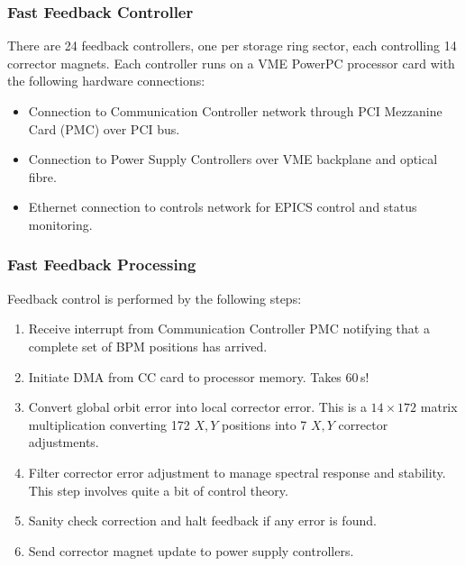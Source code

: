 \documentclass{beamer}
\begin{document}
%
\begin{frame}\frametitle{Fast Feedback Controller}

There are 24 feedback controllers, one per storage ring sector, each controlling
14 corrector magnets.  Each controller runs on a VME PowerPC processor card with
the following hardware connections:

\begin{itemize}
\item Connection to Communication Controller network through PCI Mezzanine Card
(PMC) over PCI bus.
\item Connection to Power Supply Controllers over VME backplane and optical
fibre.
\item Ethernet connection to controls network for EPICS control and status
monitoring.
\end{itemize}


\end{frame}


%
\begin{frame}\frametitle{Fast Feedback Processing}

Feedback control is performed by the following steps:

\begin{enumerate}
\item Receive interrupt from Communication Controller PMC notifying that a
complete set of BPM positions has arrived.
\item Initiate DMA from CC card to processor memory.  Takes 60\,\textmu s!
\item Convert global orbit error into local corrector error.  This is a $14
\times 172$ matrix multiplication converting 172 $X,Y$ positions into 7 $X,Y$
corrector adjustments.
\item Filter corrector error adjustment to manage spectral response and
stability.  This step involves quite a bit of control theory.
\item Sanity check correction and halt feedback if any error is found.
\item Send corrector magnet update to power supply controllers.
\end{enumerate}

\end{frame}
\end{document}
